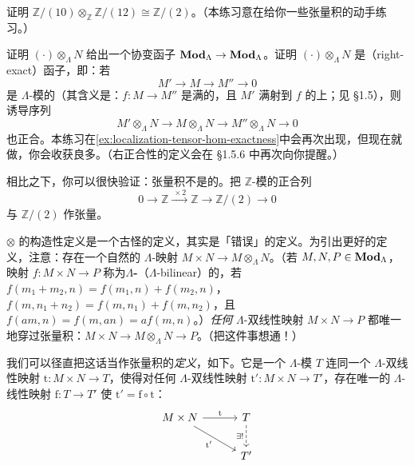 \begin{exercise}[若你此前没见过张量积]\label{ex:introductory-tensor-product-computation}
证明 $\mathbb{Z}/(10)\otimes_{\mathbb{Z}}\mathbb{Z}/(12)\cong\mathbb{Z}/(2)$。（本练习意在给你一些张量积的动手练习。）
\end{exercise}

\begin{exercise}\label{ex:tensor-right-exactness}
证明 $(\cdot)\otimes_\Lambda N$ 给出一个协变函子 $\mathbf{Mod}_{\Lambda}\to\mathbf{Mod}_{\Lambda}$。证明 $(\cdot)\otimes_\Lambda N$ 是\textbf{\trRightExact}（right-exact）函子，即：若
\[
M'\longrightarrow M\longrightarrow M''\longrightarrow 0
\]
是 $\Lambda$-模的\trExactSequence{}（其含义是：$f\colon M\to M''$ 是满的，且 $M'$ 满射到 $f$ 的\trKernel{}上；见 \S1.5），则诱导序列
\[
M'\otimes_\Lambda N\longrightarrow M\otimes_\Lambda N\longrightarrow M''\otimes_\Lambda N\longrightarrow 0
\]
也正合。本练习在\cref{ex:localization-tensor-hom-exactness}中会再次出现，但现在就做，你会收获良多。（右正合性的定义会在 \S1.5.6 中再次向你提醒。）
\end{exercise}

相比之下，你可以很快验证：张量积不是\trLeftExact{}的。把 $\mathbb{Z}$-模的正合列
\[
0\longrightarrow\mathbb{Z}\mathrel{\xrightarrow{\ \times 2\ }}\mathbb{Z}\longrightarrow\mathbb{Z}/(2)\longrightarrow 0
\]
与 $\mathbb{Z}/(2)$ 作张量。

$\otimes$ 的构造性定义是一个古怪的定义，其实是「错误」的定义。为引出更好的定义，注意：存在一个自然的 $\Lambda$-\trBilinear{}映射 $M\times N\to M\otimes_\Lambda N$。（若 $M,N,P\in\mathbf{Mod}_{\Lambda}$，映射 $f\colon M\times N\to P$ 称为\textbf{$\Lambda$-\trBilinear}（$\Lambda$-bilinear）的，若 $f(m_1+m_2,n)=f(m_1,n)+f(m_2,n)$，$f(m,n_1+n_2)=f(m,n_1)+f(m,n_2)$，且 $f(am,n)=f(m,an)=af(m,n)$。）\emph{任何} $\Lambda$-双线性映射 $M\times N\to P$ 都唯一地穿过张量积：$M\times N\to M\otimes_\Lambda N\to P$。（把这件事想通！）

我们可以径直把这话当作张量积的\emph{定义}，如下。它是一个 $\Lambda$-模 $T$ 连同一个 $\Lambda$-双线性映射 $\mathrm{t}\colon M\times N\to T$，使得对任何 $\Lambda$-双线性映射 $\mathrm{t}'\colon M\times N\to T'$，存在唯一的 $\Lambda$-线性映射 $\mathrm{f}\colon T\to T'$ 使 $\mathrm{t}'=\mathrm{f}\circ\mathrm{t}$：
\[
\begin{tikzcd}[row sep=1.9em, column sep=3em]
M\times N \ar[r,"\mathrm{t}"] \ar[dr,"\mathrm{t}'"'] & T \ar[d,dashed,"\exists!"'] \\
 & T'
\end{tikzcd}
\]

